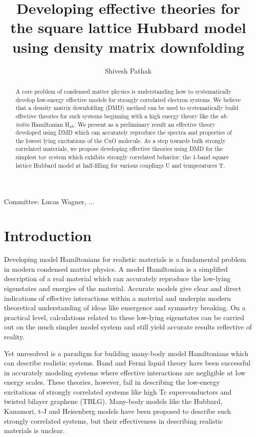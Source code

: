 \documentclass[12pt]{article}
\author{Shivesh Pathak}
\title{Developing effective theories for the square lattice Hubbard model using density matrix downfolding}
\begin{document}
\maketitle
\begin{abstract}
A core problem of condensed matter physics is understanding how to systematically develop low-energy effective models for strongly correlated electron systems. 
We believe that a density matrix downfolding (DMD) method can be used to systematically build effective theories for such systems beginning with a high energy theory like the \textit{ab-initio} Hamiltonian H$_\text{ab}$.
We present as a preliminary result an effective theory developed using DMD which can accurately reproduce the spectra and properties of the lowest lying excitations of the CuO molecule.
As a step towards bulk strongly correlated materials, we propose developing effective theories using DMD for the simplest toy system which exhibits strongly correlated behavior: the 1-band square lattice Hubbard model at half-filling for various couplings U and temperatures T.
\end{abstract}
Committee: Lucas Wagner, ...
\pagebreak

\section{Introduction}
Developing model Hamiltonians for realistic materials is a fundamental problem in modern condensed matter physics.
A model Hamiltonian is a simplified description of a real material which can accurately reproduce the low-lying eigenstates and energies of the material.
Accurate models give clear and direct indications of effective interactions within a material and underpin modern theoretical understanding of ideas like emergence and symmetry breaking.
On a practical level, calculations related to these low-lying eigenstates can be carried out on the much simpler model system and still yield accurate results reflective of reality.

Yet unresolved is a paradigm for building many-body model Hamiltonians which can describe realistic systems.
Band and Fermi liquid theory have been successful in accurately modeling systems where effective interactions are negligible at low energy scales.
These theories, however, fail in describing the low-energy excitations of strongly correlated systems like high Tc superconductors and twisted bilayer graphene (TBLG).
Many-body models like the Hubbard, Kanamori, t-J and Heisenberg models have 
been proposed to describe such strongly correlated systems, but their effectiveness in describing realistic materials is unclear.
\end{document}
